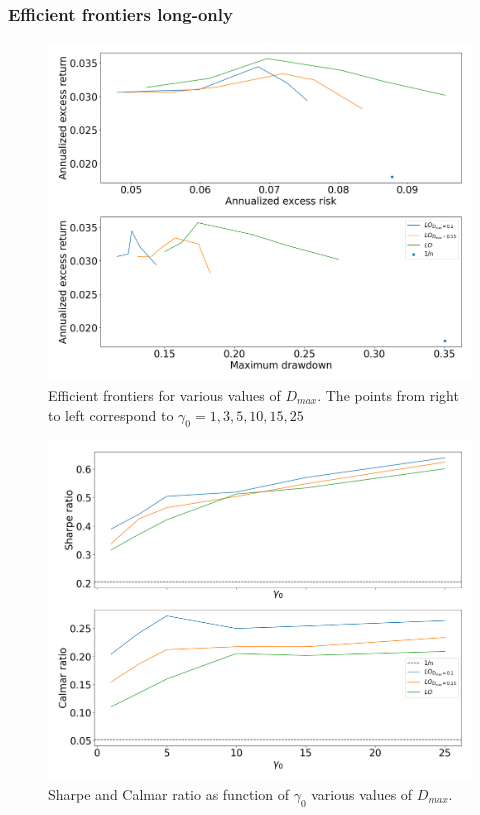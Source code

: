 \subsubsection*{Efficient frontiers long-only}

\begin{figure}[H]
    \centering
    \includegraphics[width=1\textwidth]{analysis/portfolio_exercise/images/mle/frontier_lo.png}
    \caption[Efficient frontiers for various values of $D_{max}$]{Efficient frontiers for various values of $D_{max}$. The points from right to left correspond to $\gamma_0=1,3,5,10,15,25$}
    \label{fig:MPC_frontier_lo}
\end{figure}

\begin{figure}[H]
    \centering
    \includegraphics[width=1\textwidth]{analysis/portfolio_exercise/images/mle/sharpe_frontier_lo.png}
    \caption[Sharpe and Calmar ratio as function of $\gamma_0$ various values of $D_{max}$]{Sharpe and Calmar ratio as function of $\gamma_0$ various values of $D_{max}$.}
    \label{fig:MPC_sharpe_frontier_lo}
\end{figure}


